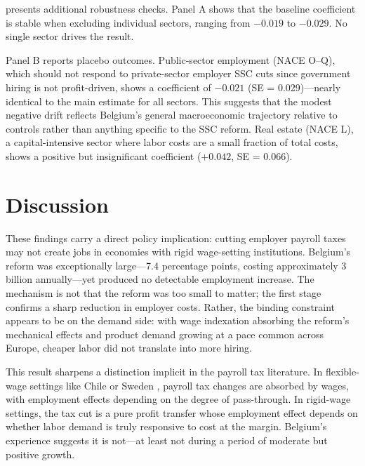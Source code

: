 \documentclass[12pt]{article}
\begin{document}


 presents additional robustness checks. Panel A shows that the baseline coefficient is stable when excluding individual sectors, ranging from $-0.019$ to $-0.029$. No single sector drives the result.

Panel B reports placebo outcomes. Public-sector employment (NACE O--Q), which should not respond to private-sector employer SSC cuts since government hiring is not profit-driven, shows a coefficient of $-0.021$ (SE = 0.029)---nearly identical to the main estimate for all sectors. This suggests that the modest negative drift reflects Belgium's general macroeconomic trajectory relative to controls rather than anything specific to the SSC reform. Real estate (NACE L), a capital-intensive sector where labor costs are a small fraction of total costs, shows a positive but insignificant coefficient ($+0.042$, SE = 0.066).

\section{Discussion} \label{sec:discussion}

These findings carry a direct policy implication: cutting employer payroll taxes may not create jobs in economies with rigid wage-setting institutions. Belgium's reform was exceptionally large---7.4 percentage points, costing approximately \texteuro{}3 billion annually---yet produced no detectable employment increase. The mechanism is not that the reform was too small to matter; the first stage confirms a sharp reduction in employer costs. Rather, the binding constraint appears to be on the demand side: with wage indexation absorbing the reform's mechanical effects and product demand growing at a pace common across Europe, cheaper labor did not translate into more hiring.

This result sharpens a distinction implicit in the payroll tax literature. In flexible-wage settings like Chile \citep{gruber1997} or Sweden \citep{saezetal2019}, payroll tax changes are absorbed by wages, with employment effects depending on the degree of pass-through. In rigid-wage settings, the tax cut is a pure profit transfer whose employment effect depends on whether labor demand is truly responsive to cost at the margin. Belgium's experience suggests it is not---at least not during a period of moderate but positive growth.
\end{document}
